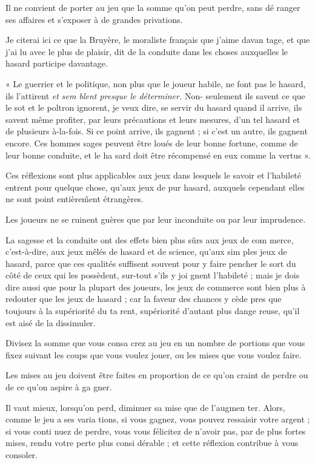Il ne convient de porter au jeu que
la somme qu'on peut perdre, sans dé%
ranger ses affaires et s'exposer à de
grandes privations.

Je citerai ici ce que la Bruyère, le
moraliste français que j'aime davan%
tage, et que j'ai lu avec le plus de
plaisir, dit de la conduite dans les
choses auxquelles le hasard participe
davantage.

« Le guerrier et le politique, non
plus que le joueur habile, ne font
pas le hasard, ils l'attirent \emph{et sem%
blent presque le déterminer.} Non-%
seulement ils savent ce que le sot et
le poltron ignorent, je veux dire, se
servir du hasard quand il arrive,
ils savent même profiter, par leurs
précautions et leurs mesures, d'un
tel hasard et de plusieurs à-la-fois.
Si ce point arrive, ils gagnent ; si
c'est un autre, ils gagnent encore.
Ces hommes sages peuvent être
loués de leur bonne fortune, comme
de leur bonne conduite, et le ha%
sard doit être récompensé en eux
comme la vertus ».

Ces réflexions sont plus applicables
aux jeux dans lesquels le savoir et
l'habileté entrent pour quelque chose,
qu'aux jeux de pur hasard, auxquels
cependant elles ne sont point entière\~%
ment étrangères.

Les joueurs ne se ruinent guères
que par leur inconduite ou par leur
imprudence.

La sagesse et la conduite ont des
effets bien plus sûrs aux jeux de com%
merce, c'est-à-dire, aux jeux mêlés
de hasard et de science, qu'aux sim%
ples jeux de hasard, parce que ces
qualités suffisent souvent pour y
faire pencher le sort du côté de ceux
qui les possèdent, sur-tout s'ils y joi%
gnent l'habileté ; mais je dois dire
aussi que pour la plupart des joueurs,
les jeux de commerce sont bien plus
à redouter que les jeux de hasard ;
car la faveur des chances y cède  pres%
que toujours à la supériorité du ta%
rent, supériorité d'autant plus dange%
reuse, qu'il est aisé de la dissimuler.

Divisez la somme que vous consa%
crez au jeu en un nombre de portions
que vous fixez suivant les coups que
vous voulez jouer, ou les mises que
vous voulez faire.

Les mises au jeu doivent être faites
en proportion de ce qu'on craint de
perdre ou de ce qu'on aspire à ga%
gner.

Il vaut mieux, lorsqu'on perd,
diminuer sa mise que de l'augmen%
ter. Alors, comme le jeu a ses varia%
tions, si vous gagnez, vous pouvez
ressaisir votre argent ; si vous conti%
nuez de perdre, vous vous félicitez
de n'avoir pas, par de plus fortes
mises, rendu votre perte plus consi%
dérable ;  et cette réflexion contribue
à vous consoler.

